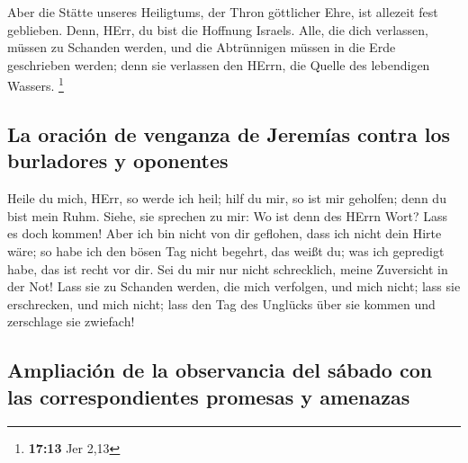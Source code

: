  Aber die Stätte unseres Heiligtums, der Thron göttlicher
Ehre, ist allezeit fest geblieben.  Denn, HErr, du bist
die Hoffnung Israels. Alle, die dich verlassen, müssen zu Schanden
werden, und die Abtrünnigen müssen in die Erde geschrieben werden; denn
sie verlassen den HErrn, die Quelle des lebendigen Wassers. \footnote{\textbf{17:13}
  Jer 2,13}

\hypertarget{la-oraciuxf3n-de-venganza-de-jeremuxedas-contra-los-burladores-y-oponentes}{%
\subsection{La oración de venganza de Jeremías contra los burladores y
oponentes}\label{la-oraciuxf3n-de-venganza-de-jeremuxedas-contra-los-burladores-y-oponentes}}

 Heile du mich, HErr, so werde ich heil; hilf du mir, so
ist mir geholfen; denn du bist mein Ruhm.  Siehe, sie
sprechen zu mir: Wo ist denn des HErrn Wort? Lass es doch kommen!
 Aber ich bin nicht von dir geflohen, dass ich nicht dein
Hirte wäre; so habe ich den bösen Tag nicht begehrt, das weißt du; was
ich gepredigt habe, das ist recht vor dir.  Sei du mir
nur nicht schrecklich, meine Zuversicht in der Not!  Lass
sie zu Schanden werden, die mich verfolgen, und mich nicht; lass sie
erschrecken, und mich nicht; lass den Tag des Unglücks über sie kommen
und zerschlage sie zwiefach!

\hypertarget{ampliaciuxf3n-de-la-observancia-del-suxe1bado-con-las-correspondientes-promesas-y-amenazas}{%
\subsection{Ampliación de la observancia del sábado con las
correspondientes promesas y
amenazas}\label{ampliaciuxf3n-de-la-observancia-del-suxe1bado-con-las-correspondientes-promesas-y-amenazas}}

